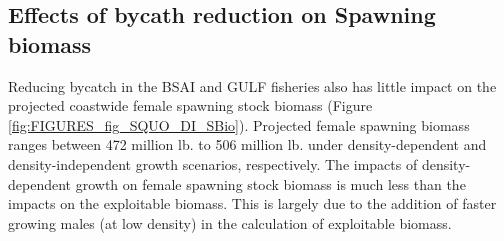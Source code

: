 \subsection{Effects of bycath reduction on Spawning biomass} %
\label{sub:effects_of_bycath_reduction_on_spawning_biomass}
Reducing bycatch in the BSAI and GULF fisheries also has little impact on the projected coastwide female spawning stock biomass (Figure \ref{fig:FIGURES_fig_SQUO_DI_SBio}).  Projected female spawning biomass ranges between 472 million lb. to 506 million lb. under density-dependent and density-independent growth scenarios, respectively.  The impacts of density-dependent growth on female spawning stock biomass is much less than the impacts on the exploitable biomass.  This is largely due to the addition of faster growing males (at low density) in the calculation of exploitable biomass.
